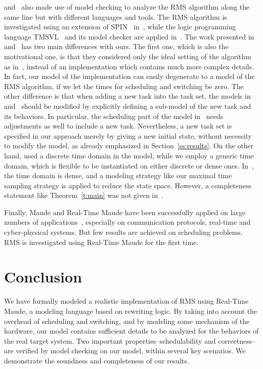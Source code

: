 \documentclass[10pt,journal]{IEEEtran}
\begin{document}
{\cite{TianD2011} and~\cite{DBLP:conf/iceccs/CuiDT14} also made use of
model checking to analyze the RMS algorithm along the same line but
with different languages and tools. The RMS algorithm is investigated
using an extension of SPIN~\cite{DBLP:journals/tse/Holzmann97}
in~\cite{TianD2011}, while the logic programming language
TMSVL~\cite{DBLP:conf/icfem/HanDW12} and its model checker are applied
in~\cite{DBLP:conf/iceccs/CuiDT14}. The work presented
in~\cite{TianD2011} and~\cite{DBLP:conf/iceccs/CuiDT14} has two main
differences with ours. The first one, which is also the motivational
one, is that they considered only the ideal setting of the algorithm
as in~\cite{DBLP:journals/jacm/LiuL73}, instead of an implementation
which contains much more complex details. In fact, our model of the
implementation can easily degenerate to a model of the RMS algorithm,
if we let the times for scheduling and switching be zero. The other
difference is that when adding a new task into the task set, the
models in~\cite{TianD2011} and~\cite{DBLP:conf/iceccs/CuiDT14} should
be modified by explicitly defining a sub-model of the new task and its
behaviors. In particular, the scheduling part of the model
in~\cite{TianD2011} needs adjustments as well to include a new
task. Nevertheless, a new task set is specified in our approach merely
by giving a new initial state, without necessity to modify the model,
as already emphasized in Section~\ref{ss:results}. On the other hand,
\cite{TianD2011} used a discrete time domain in the model, while we
employ a generic time domain, which is flexible to be instantiated on
either discrete or dense ones. In~\cite{DBLP:conf/iceccs/CuiDT14}, the
time domain is dense, and a modeling strategy like our maximal time
sampling strategy is applied to reduce the state space. However, a
completeness statement like Theorem~\ref{t:main} was not given
in~\cite{DBLP:conf/iceccs/CuiDT14}.

Finally, Maude and Real-Time Maude have been successfully applied on
large numbers of applications~\cite{DBLP:journals/jlp/Meseguer12},
especially on communication protocols, real-time and cyber-physical
systems. But few results are achieved on scheduling problems. RMS is
investigated using Real-Time Maude for the first time.

\section{Conclusion}
\label{s:conclusion}
We have formally modeled a realistic implementation of RMS using
Real-Time Maude, a modeling language based on rewriting logic. By
taking into account the overhead of scheduling and switching, and by
modeling some mechanism of the hardware, our model contains sufficient
details to be analyzed for the behaviors of the real target
system. Two important properties--schedulability and correctness--are
verified by model checking on our model, within several key
scenarios. We demonstrate the soundness and completeness of our
results.


}
\end{document}
